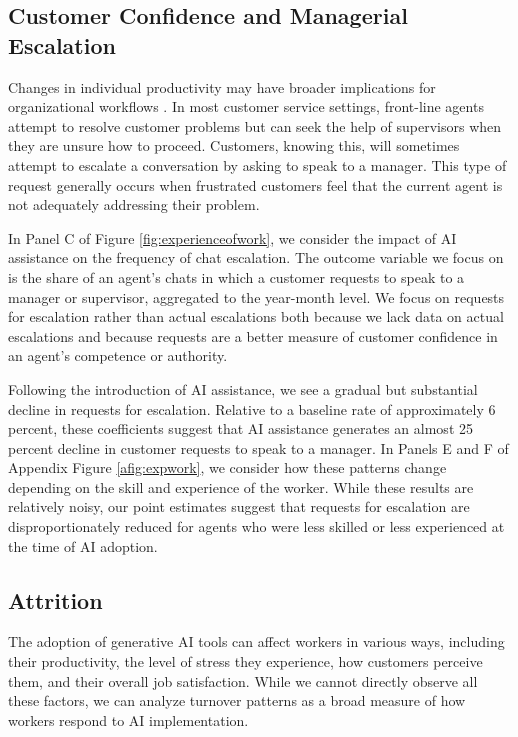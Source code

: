 \documentclass[11pt]{article}
\begin{document}
\subsection{Customer Confidence and Managerial Escalation}

Changes in individual productivity may have broader implications for organizational workflows \citep{athey_allocation_1994, atheystern_1998, garicano_hierarchies_2000}.  
In most customer service settings, front-line agents attempt to resolve customer problems but can seek the help of supervisors when they are unsure how to proceed.  Customers, knowing this, will sometimes attempt to escalate a conversation by asking to speak to a manager. This type of request generally occurs when frustrated customers feel that the current agent is not adequately addressing their problem.

In Panel C of Figure \ref{fig:experienceofwork}, we consider the impact of AI assistance on the frequency of chat escalation.  The outcome variable we focus on is the share of an agent's chats in which a customer requests to speak to a manager or supervisor, aggregated to the year-month level.  We focus on requests for escalation rather than actual escalations both because we lack data on actual escalations and because requests are a better measure of customer confidence in an agent's competence or authority.  

Following the introduction of AI assistance, we see a gradual but substantial decline in requests for escalation.  Relative to a baseline rate of approximately 6 percent, these coefficients suggest that AI assistance generates an almost 25 percent decline in customer requests to speak to a manager.  In Panels E and F of Appendix Figure \ref{afig:expwork}, we consider how these patterns change depending on the skill and experience of the worker.  While these results are relatively noisy, our point estimates suggest that requests for escalation are disproportionately reduced for agents who were less skilled or less experienced at the time of AI adoption.   

\subsection{Attrition}

The adoption of generative AI tools can affect workers in various ways, including their productivity, the level of stress they experience, how customers perceive them, and their overall job satisfaction. While we cannot directly observe all these factors, we can analyze turnover patterns as a broad measure of how workers respond to AI implementation.
\end{document}
